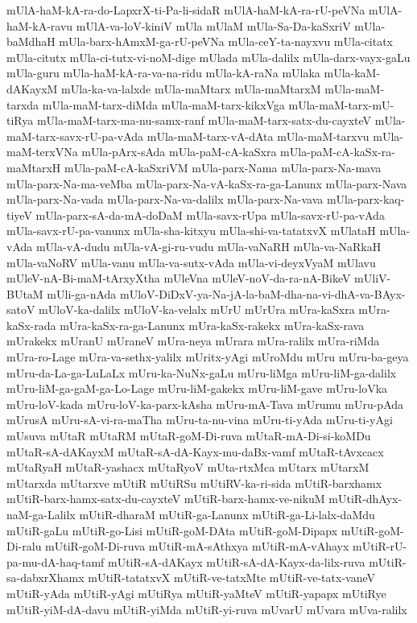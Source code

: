 {mUlA-haM-kA-ra-do-LapxrX-ti-Pa-li-sidaR
mUlA-haM-kA-ra-rU-peVNa
mUlA-haM-kA-ravu
mUlA-va-loV-kiniV
mUla
mUlaM
mUla-Sa-Da-kaSxriV
mUla-baMdhaH
mUla-barx-hAmxM-ga-rU-peVNa
mUla-ceY-ta-nayxvu
mUla-citatx
mUla-citutx
mUla-ci-tutx-vi-noM-dige
mUlada
mUla-dalilx
mUla-darx-vayx-gaLu
mUla-guru
mUla-haM-kA-ra-va-na-ridu
mUla-kA-raNa
mUlaka
mUla-kaM-dAKayxM
mUla-ka-va-lalxde
mUla-maMtarx
mUla-maMtarxM
mUla-maM-tarxda
mUla-maM-tarx-diMda
mUla-maM-tarx-kikxVga
mUla-maM-tarx-mU-tiRya
mUla-maM-tarx-ma-nu-samx-ranf
mUla-maM-tarx-satx-du-cayxteV
mUla-maM-tarx-savx-rU-pa-vAda
mUla-maM-tarx-vA-dAta
mUla-maM-tarxvu
mUla-maM-terxVNa
mUla-pArx-sAda
mUla-paM-cA-kaSxra
mUla-paM-cA-kaSx-ra-maMtarxH
mUla-paM-cA-kaSxriVM
mUla-parx-Nama
mUla-parx-Na-mava
mUla-parx-Na-ma-veMba
mUla-parx-Na-vA-kaSx-ra-ga-Lanunx
mUla-parx-Nava
mUla-parx-Na-vada
mUla-parx-Na-va-dalilx
mUla-parx-Na-vava
mUla-parx-kaq-tiyeV
mUla-parx-sA-da-mA-doDaM
mUla-savx-rUpa
mUla-savx-rU-pa-vAda
mUla-savx-rU-pa-vanunx
mUla-sha-kitxyu
mUla-shi-va-tatatxvX
mUlataH
mUla-vAda
mUla-vA-dudu
mUla-vA-gi-ru-vudu
mUla-vaNaRH
mUla-va-NaRkaH
mUla-vaNoRV
mUla-vanu
mUla-va-sutx-vAda
mUla-vi-deyxVyaM
mUlavu
mUleV-nA-Bi-maM-tArxyXtha
mUleVna
mUleV-noV-da-ra-nA-BikeV
mUliV-BUtaM
mUli-ga-nAda
mUloV-DiDxV-ya-Na-jA-la-baM-dha-na-vi-dhA-va-BAyx-satoV
mUloV-ka-dalilx
mUloV-ka-velalx
mUrU
mUrUra
mUra-kaSxra
mUra-kaSx-rada
mUra-kaSx-ra-ga-Lanunx
mUra-kaSx-rakekx
mUra-kaSx-rava
mUrakekx
mUranU
mUraneV
mUra-neya
mUrara
mUra-ralilx
mUra-riMda
mUra-ro-Lage
mUra-va-sethx-yalilx
mUritx-yAgi
mUroMdu
mUru
mUru-ba-geya
mUru-da-La-ga-LuLaLx
mUru-ka-NuNx-gaLu
mUru-liMga
mUru-liM-ga-dalilx
mUru-liM-ga-gaM-ga-Lo-Lage
mUru-liM-gakekx
mUru-liM-gave
mUru-loVka
mUru-loV-kada
mUru-loV-ka-parx-kAsha
mUru-mA-Tava
mUrumu
mUru-pAda
mUrusA
mUru-sA-vi-ra-maTha
mUru-ta-nu-vina
mUru-ti-yAda
mUru-ti-yAgi
mUsuva
mUtaR
mUtaRM
mUtaR-goM-Di-ruva
mUtaR-mA-Di-si-koMDu
mUtaR-sA-dAKayxM
mUtaR-sA-dA-Kayx-mu-daBx-vamf
mUtaR-tAvxcacx
mUtaRyaH
mUtaR-yashacx
mUtaRyoV
mUta-rtxMca
mUtarx
mUtarxM
mUtarxda
mUtarxve
mUtiR
mUtiRSu
mUtiRV-ka-ri-sida
mUtiR-barxhamx
mUtiR-barx-hamx-satx-du-cayxteV
mUtiR-barx-hamx-ve-nikuM
mUtiR-dhAyx-naM-ga-Lalilx
mUtiR-dharaM
mUtiR-ga-Lanunx
mUtiR-ga-Li-lalx-daMdu
mUtiR-gaLu
mUtiR-go-Lisi
mUtiR-goM-DAta
mUtiR-goM-Dipapx
mUtiR-goM-Di-ralu
mUtiR-goM-Di-ruva
mUtiR-mA-sAthxya
mUtiR-mA-vAhayx
mUtiR-rU-pa-mu-dA-haq-tamf
mUtiR-sA-dAKayx
mUtiR-sA-dA-Kayx-da-lilx-ruva
mUtiR-sa-dabxrXhamx
mUtiR-tatatxvX
mUtiR-ve-tatxMte
mUtiR-ve-tatx-vaneV
mUtiR-yAda
mUtiR-yAgi
mUtiRya
mUtiR-yaMteV
mUtiR-yapapx
mUtiRye
mUtiR-yiM-dA-davu
mUtiR-yiMda
mUtiR-yi-ruva
mUvarU
mUvara
mUva-ralilx
}
